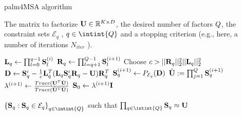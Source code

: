 \begin{algorithm}
	\caption{palm4MSA algorithm}
	\label{algo:palm4msa}
	\begin{algorithmic}[1]
		
		\REQUIRE The matrix to factorize ${\mathbf{U}} \in \mathbb{R}^{K \times D}$, the desired number of factors $Q$, the constraint sets $\mathcal{E}_q$ , $q\in \intint{\nfactors}$ and a stopping criterion (e.g., here, a number of iterations $N_{iter}$ ).
		
		
		\STATE  ${\mathbf{L}}_q \leftarrow \prod_{l=0}^{q-1} {\mathbf{S}}_{l}^{(i)}$
		\STATE  ${\mathbf{R}}_q \leftarrow \prod_{l=q+1}^{Q-1} {\mathbf{S}}_{l}^{(i+1)}$
		\STATE Choose $c > ||{\mathbf{R}}_q||_2^2 ||{\mathbf{L}}_q||_2^2$
		\STATE ${\mathbf{D}} \leftarrow {\mathbf{S}}_q^i - \frac{1}{c} {\mathbf{L}}_q^T({\mathbf{L}}_q {\mathbf{S}}_q^i {\mathbf{R}}_q - {\mathbf{U}}){\mathbf{R}}_q^T$
		\STATE ${\mathbf{S}}^{(i+1)}_q \leftarrow P_{\mathcal{E}_q}({\mathbf{D}})$
		\ENDFOR
		\STATE $\hat {{\mathbf{U}}} := \prod_{j=1}^{Q} {\mathbf{S}}_q^{(i+1)}$
		\STATE $\lambda^{(i+1)} \leftarrow \frac{Trace({\mathbf{U}}^T\hat{{\mathbf{U}}})}{Trace(\hat{{\mathbf{U}}}^T\hat{{\mathbf{U}}})}$
		\STATE ${\mathbf{S}}_0 \leftarrow \lambda^{(i+1)} {\mathbf{I}}$
		\ENDFOR
		
		\ENSURE $\left \lbrace \rmS_q : \rmS_q \in \mathcal{E}_q\right \rbrace_{q\in\intint{\nfactors}}$ such that $\prod_{q\in\intint{\nfactors}}\rmS_q \approx \rmU$
		
	\end{algorithmic}
\end{algorithm}

